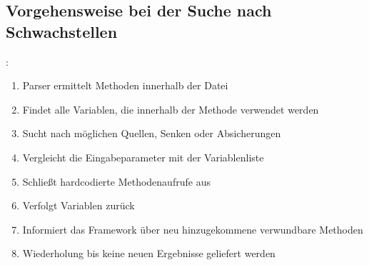 
    \subsection{Vorgehensweise bei der Suche nach Schwachstellen}
        \begin{frame}{\secname: \subsecname}
            \begin{enumerate}
                \item Parser ermittelt Methoden innerhalb der Datei
                \item Findet alle Variablen, die innerhalb der Methode verwendet werden
                \item Sucht nach möglichen Quellen, Senken oder Absicherungen
                \item Vergleicht die Eingabeparameter mit der Variablenliste
                \item[\textrightarrow] Schließt hardcodierte Methodenaufrufe aus
                \item Verfolgt Variablen zurück
                \item Informiert das Framework über neu hinzugekommene verwundbare Methoden
                \item Wiederholung bis keine neuen Ergebnisse geliefert werden
            \end{enumerate}
        \end{frame}

